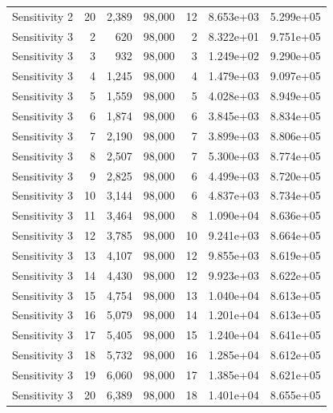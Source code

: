 \begin{table}[]
\begin{tabular}{lrrrrrr}
 Sensitivity 2 & 20 & 2,389 &  98,000 &   12 & 8.653e+03 & 5.299e+05 \\
 Sensitivity 3 & 2 & 620 &  98,000 &   2 & 8.322e+01 & 9.751e+05 \\
 Sensitivity 3 & 3 & 932 &  98,000 &   3 & 1.249e+02 & 9.290e+05 \\
 Sensitivity 3 & 4 & 1,245 &  98,000 &   4 & 1.479e+03 & 9.097e+05 \\
 Sensitivity 3 & 5 & 1,559 &  98,000 &   5 & 4.028e+03 & 8.949e+05 \\
 Sensitivity 3 & 6 & 1,874 &  98,000 &   6 & 3.845e+03 & 8.834e+05 \\
 Sensitivity 3 & 7 & 2,190 &  98,000 &   7 & 3.899e+03 & 8.806e+05 \\
 Sensitivity 3 & 8 & 2,507 &  98,000 &   7 & 5.300e+03 & 8.774e+05 \\
 Sensitivity 3 & 9 & 2,825 &  98,000 &   6 & 4.499e+03 & 8.720e+05 \\
 Sensitivity 3 & 10 & 3,144 &  98,000 &   6 & 4.837e+03 & 8.734e+05 \\
 Sensitivity 3 & 11 & 3,464 &  98,000 &   8 & 1.090e+04 & 8.636e+05 \\
 Sensitivity 3 & 12 & 3,785 &  98,000 &   10 & 9.241e+03 & 8.664e+05 \\
 Sensitivity 3 & 13 & 4,107 &  98,000 &   12 & 9.855e+03 & 8.619e+05 \\
 Sensitivity 3 & 14 & 4,430 &  98,000 &   12 & 9.923e+03 & 8.622e+05 \\
 Sensitivity 3 & 15 & 4,754 &  98,000 &   13 & 1.040e+04 & 8.613e+05 \\
 Sensitivity 3 & 16 & 5,079 &  98,000 &   14 & 1.201e+04 & 8.613e+05 \\
 Sensitivity 3 & 17 & 5,405 &  98,000 &   15 & 1.240e+04 & 8.641e+05 \\
 Sensitivity 3 & 18 & 5,732 &  98,000 &   16 & 1.285e+04 & 8.612e+05 \\
 Sensitivity 3 & 19 & 6,060 &  98,000 &   17 & 1.385e+04 & 8.621e+05 \\
 Sensitivity 3 & 20 & 6,389 &  98,000 &   18 & 1.401e+04 & 8.655e+05 \\
 \bottomrule
 \end{tabular}
 \label{tab:aadh_h_state_selection}
\end{table}


